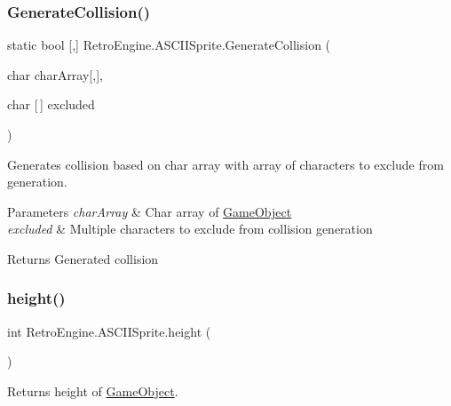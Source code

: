 \subsubsection{\texorpdfstring{GenerateCollision()}{GenerateCollision()}\hspace{0.1cm}{\footnotesize\ttfamily [2/2]}}
{\footnotesize\ttfamily static bool \mbox{[},\mbox{]} Retro\+Engine.\+A\+S\+C\+I\+I\+Sprite.\+Generate\+Collision (\begin{DoxyParamCaption}\item[{char}]{char\+Array\mbox{[},\mbox{]},  }\item[{char \mbox{[}$\,$\mbox{]}}]{excluded }\end{DoxyParamCaption})\hspace{0.3cm}{\ttfamily [static]}}



Generates collision based on char array with array of characters to exclude from generation. 


\begin{DoxyParams}{Parameters}
{\em char\+Array} & Char array of \mbox{\hyperlink{class_retro_engine_1_1_game_object}{Game\+Object}}\\
\hline
{\em excluded} & Multiple characters to exclude from collision generation\\
\hline
\end{DoxyParams}
\begin{DoxyReturn}{Returns}
Generated collision
\end{DoxyReturn}
\mbox{\label{class_retro_engine_1_1_a_s_c_i_i_sprite_a27914fc12903dbba66f51a5a3374748e}} 
\subsubsection{\texorpdfstring{height()}{height()}}
{\footnotesize\ttfamily int Retro\+Engine.\+A\+S\+C\+I\+I\+Sprite.\+height (\begin{DoxyParamCaption}{ }\end{DoxyParamCaption})}



Returns height of \mbox{\hyperlink{class_retro_engine_1_1_game_object}{Game\+Object}}. 

\mbox{\label{class_retro_engine_1_1_a_s_c_i_i_sprite_a2e59c926d99fa49f70d164f7877c5f16}} 
